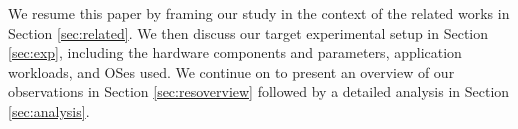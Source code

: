 We resume this paper by
framing our study in the context of the related works in Section \ref{sec:related}.
We then discuss our target experimental setup in Section \ref{sec:exp},
including the hardware components and parameters,
application workloads,
and OSes used.
We continue on to present an overview of our observations in Section \ref{sec:resoverview} followed by a detailed analysis in Section \ref{sec:analysis}.



